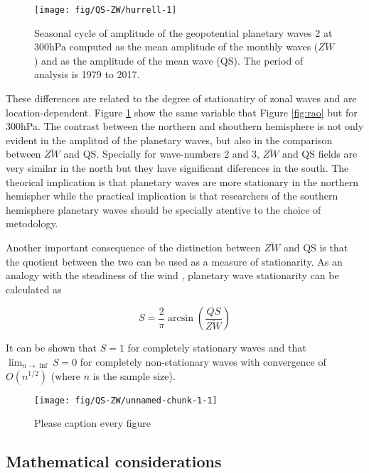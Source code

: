 \documentclass[draft,linenumbers]{agujournal2018}
\begin{document}
\begin{figure}[h]
\texttt{[image: fig/QS-ZW/hurrell-1]} \caption{Seasonal cycle of amplitude of the geopotential planetary waves 2 at 300hPa computed as the mean amplitude of the monthly waves ($\overline{ZW}$) and as the amplitude of the mean wave (QS). The period of analysis is 1979 to 2017.}\label{fig:hurrell}
\end{figure}

These differences are related to the degree of stationatiry of zonal
waves and are location-dependent. Figure \ref{fig:hurrell} show the same
variable that Figure \ref{fig:rao} but for 300hPa. The contrast between
the northern and shouthern hemisphere is not only evident in the
amplitud of the planetary waves, but also in the comparison between
\(\overline{ZW}\) and QS. Specially for wave-numbers 2 and 3,
\(\overline{ZW}\) and QS fields are very similar in the north but they
have significant diferences in the south. The theorical implication is
that planetary waves are more stationary in the northern hemispher while
the practical implication is that researchers of the southern hemisphere
planetary waves should be specially atentive to the choice of
metodology.

Another important consequence of the distinction between
\(\overline{ZW}\) and QS is that the quotient between the two can be
used as a measure of stationarity. As an analogy with the steadiness of
the wind \citep{Singer1967}, planetary wave stationarity can be
calculated as

\begin{linenomath*}
\begin{equation}
S = \frac{2}{\pi}\arcsin{\left ( \frac{QS}{\overline{ZW}} \right )}
\end{equation}
\end{linenomath*}

It can be shown that \(S = 1\) for completely stationary waves and that
\(\lim_{n \rightarrow \inf} S = 0\) for completely non-stationary waves
with convergence of \(O\left (n^{1/2}\right)\) (where \(n\) is the
sample size).

\begin{figure}[h]
\texttt{[image: fig/QS-ZW/unnamed-chunk-1-1]} \caption{Please caption every figure}\label{fig:unnamed-chunk-1}
\end{figure}

\subsection{Mathematical considerations}
\end{document}
